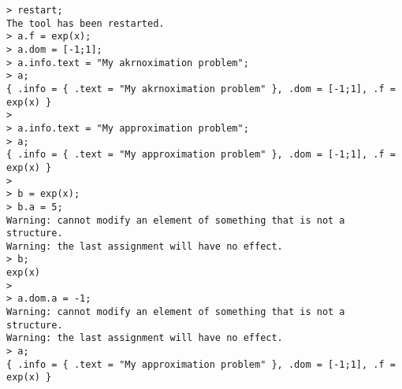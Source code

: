 \begin{center}\begin{minipage}{15cm}\begin{Verbatim}[frame=single]
> restart;
The tool has been restarted.
> a.f = exp(x);
> a.dom = [-1;1];
> a.info.text = "My akrnoximation problem";
> a;
{ .info = { .text = "My akrnoximation problem" }, .dom = [-1;1], .f = exp(x) }
> 
> a.info.text = "My approximation problem";
> a;
{ .info = { .text = "My approximation problem" }, .dom = [-1;1], .f = exp(x) }
> 
> b = exp(x);
> b.a = 5;
Warning: cannot modify an element of something that is not a structure.
Warning: the last assignment will have no effect.
> b;
exp(x)
> 
> a.dom.a = -1;
Warning: cannot modify an element of something that is not a structure.
Warning: the last assignment will have no effect.
> a;
{ .info = { .text = "My approximation problem" }, .dom = [-1;1], .f = exp(x) }
\end{Verbatim}
\end{minipage}\end{center}
